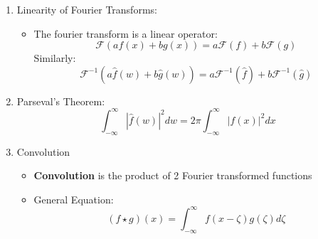 \documentclass[11.5pt,a4paper]{article}
\begin{document}
\begin{itemize}
\begin{enumerate}
\begin{itemize}
            \item Derivation:
            \begin{align*}
                \mathcal{F}\left(\frac{d}{dx} f(x) \right) &= \int^\infty_{-\infty} f^{'}(x)\psi_k(x)dx \\
                &= \int^\infty_{-\infty} f^{'}(x)e^{-iwx}dx \\
                &= \left[ f(x)e^{-iwx}\right]^{\infty}_{-\infty} - \int^\infty_{-\infty} f(x)\left[-iwe^{-iwx}\right]dx \\
                &= iw\int^\infty_{-\infty} f(x)e^{-iwx}dx \\
                &= iw\mathcal{F}(f(x))
            \end{align*}
            Therefore:
            \begin{equation*}
                \mathcal{F}\left(\frac{d^n}{dx^n} f(x)\right) = i^nw^n\mathcal{F}(f(x))
            \end{equation*}
        \end{itemize}
        \item Linearity of Fourier Transforms:
        \begin{itemize}
            \item The fourier transform is a linear operator:
            \begin{equation*}
                \mathcal{F}(af(x) + bg(x)) = a\mathcal{F}(f) + b\mathcal{F}(g)
            \end{equation*}
            Similarly:
            \begin{equation*}
                \mathcal{F}^{-1}(a\hat{f}(w) + b\hat{g}(w)) = a\mathcal{F}^{-1}(\hat{f}) + b\mathcal{F}^{-1}(\hat{g})
            \end{equation*}
        \end{itemize}
        \item Parseval's Theorem:
        \begin{equation*}
            \int_{-\infty}^{\infty} |\hat{f}(w)|^2dw =2\pi\int_{-\infty}^{\infty} |f(x)|^2dx
        \end{equation*}
        \item Convolution
        \begin{itemize}
            \item \textbf{Convolution} is the product of 2 Fourier transformed functions
            \item General Equation:
            \begin{equation*}
                (f\star g)(x) = \int_{-\infty}^{\infty} f(x - \zeta)g(\zeta)d\zeta

\end{equation*}
\end{itemize}
\end{enumerate}
\end{itemize}
\end{document}

